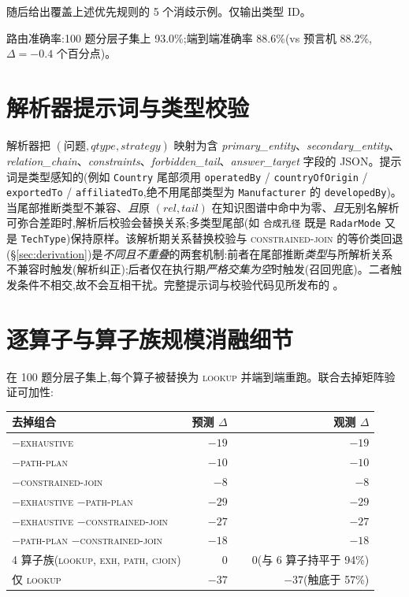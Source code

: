\documentclass[11pt,a4paper]{article}
\newcommand{\op}[1]{\textsc{\small #1}}
\begin{document}
随后给出覆盖上述优先规则的 5 个消歧示例。仅输出类型 ID。

路由准确率:100 题分层子集上 93.0\%;端到端准确率 88.6\%(vs 预言机 88.2\%,$\Delta=-0.4$ 个百分点)。

\section{解析器提示词与类型校验}
\label{app:parser}

解析器把 $(\textit{问题}, \textit{qtype}, \textit{strategy})$ 映射为含 \textit{primary\_entity}、\textit{secondary\_entity}、\textit{relation\_chain}、\textit{constraints}、\textit{forbidden\_tail}、\textit{answer\_target} 字段的 JSON。提示词是类型感知的(例如 \texttt{Country} 尾部须用 \texttt{operatedBy} / \texttt{countryOfOrigin} / \texttt{exportedTo} / \texttt{affiliatedTo},绝不用尾部类型为 \texttt{Manufacturer} 的 \texttt{developedBy})。当尾部推断类型不兼容、\emph{且}原 $(rel, tail)$ 在知识图谱中命中为零、\emph{且}无别名解析可弥合差距时,解析后校验会替换关系;多类型尾部(如 \texttt{合成孔径} 既是 \texttt{RadarMode} 又是 \texttt{TechType})保持原样。该解析期关系替换校验与 \op{constrained-join} 的等价类回退(\S\ref{sec:derivation})是\emph{不同且不重叠}的两套机制:前者在尾部推断\emph{类型}与所解析关系不兼容时触发(解析纠正);后者仅在执行期\emph{严格交集为空}时触发(召回兜底)。二者触发条件不相交,故不会互相干扰。完整提示词与校验代码见所发布的 。

\section{逐算子与算子族规模消融细节}
\label{app:ablation}

在 100 题分层子集上,每个算子被替换为 \op{lookup} 并端到端重跑。联合去掉矩阵验证可加性:

\begin{table}[h]
\centering\small
\begin{tabular}{l r r}
\toprule
\textbf{去掉组合} & \textbf{预测 $\Delta$} & \textbf{观测 $\Delta$} \\
\midrule
$-$\op{exhaustive}                                              & $-19$ & $-19$ \\
$-$\op{path-plan}                                               & $-10$ & $-10$ \\
$-$\op{constrained-join}                                        & $-8$  & $-8$  \\
$-$\op{exhaustive} $-$\op{path-plan}                            & $-29$ & $-29$ \\
$-$\op{exhaustive} $-$\op{constrained-join}                     & $-27$ & $-27$ \\
$-$\op{path-plan} $-$\op{constrained-join}                      & $-18$ & $-18$ \\
4 算子族(\op{lookup}, \op{exh}, \op{path}, \op{cjoin})       & $\phantom{-}0$ & $\phantom{-}0$(与 6 算子持平于 94\%) \\
仅 \op{lookup}                                                & $-37$ & $-37$(触底于 57\%) \\
\bottomrule
\end{tabular}
\end{table}
\end{document}
